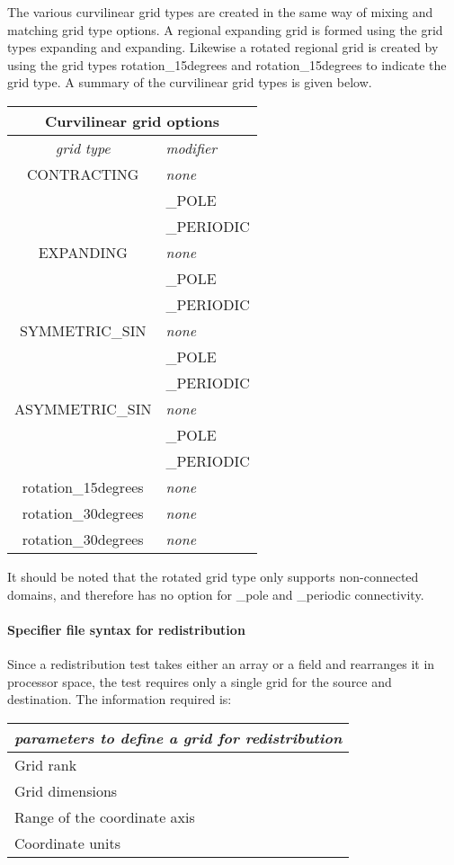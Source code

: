 The various curvilinear grid types are created in the same way of mixing and matching grid type options. A regional expanding grid is formed using the grid types expanding and expanding. Likewise a rotated regional grid is created by
using the grid types rotation\_15degrees and rotation\_15degrees to indicate the grid type. A summary of the curvilinear grid types is given below. 
\begin{center}
\begin{tabular}{| c | l |} 
\multicolumn{2}{c}{Curvilinear grid options}  \\
\hline
{\em grid type } & {\em modifier} \\
\hline \hline
 CONTRACTING & {\em none} \\ 
                    &   \_POLE       \\
                    &   \_PERIODIC  \\
 \hline                   
 EXPANDING  & {\em none} \\ 
                    &   \_POLE       \\
                    &   \_PERIODIC  \\
\hline
SYMMETRIC\_SIN & {\em none} \\ 
                    &   \_POLE       \\
                    &   \_PERIODIC  \\
\hline
ASYMMETRIC\_SIN & {\em none} \\ 
                    &   \_POLE       \\
                    &   \_PERIODIC  \\
\hline
rotation\_15degrees & {\em none} \\ 
\hline
rotation\_30degrees & {\em none} \\ 
\hline
rotation\_30degrees & {\em none} \\ 
\hline 
\end{tabular}
\end{center}
It should be noted that the rotated grid type only supports non-connected domains, and therefore has no option for \_pole and \_periodic connectivity.


\paragraph{Specifier file syntax for redistribution}
Since a redistribution test takes either an array or a field and rearranges it in processor space, the test requires only a single grid for the source and destination. The information required is:
\begin{center}
\begin{tabular}{| l |} \hline 
{\em parameters to define a grid for redistribution }  \\
\hline \hline
 Grid rank    \\
 Grid dimensions   \\
 Range of the coordinate axis  \\
 Coordinate units \\
\hline 
\end{tabular}
\end{center}

